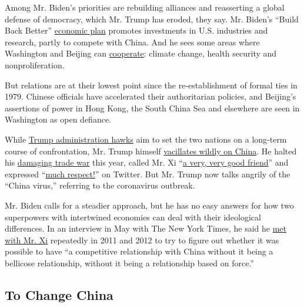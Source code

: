 Among Mr. Biden's priorities are rebuilding alliances and reasserting a
global defense of democracy, which Mr. Trump has eroded, they say. Mr.
Biden's ``Build Back Better''
\href{https://www.nytimes3xbfgragh.onion/2020/07/09/us/politics/biden-buy-american.html}{economic
plan} promotes investments in U.S. industries and research, partly to
compete with China. And he sees some areas where Washington and Beijing
can
\href{https://www.foreignaffairs.com/articles/united-states/2020-01-23/why-america-must-lead-again}{cooperate}:
climate change, health security and nonproliferation.

But relations are at their lowest point since the re-establishment of
formal ties in 1979. Chinese officials have accelerated their
authoritarian policies, and Beijing's assertions of power in Hong Kong,
the South China Sea and elsewhere are seen in Washington as open
defiance.

While
\href{https://www.nytimes3xbfgragh.onion/2020/07/25/world/asia/us-china-trump-xi.html}{Trump
administration hawks} aim to set the two nations on a long-term course
of confrontation, Mr. Trump himself
\href{https://www.nytimes3xbfgragh.onion/2020/06/18/us/politics/trump-china-bolton.html}{vacillates
wildly on China}. He halted his
\href{https://www.nytimes3xbfgragh.onion/2020/01/22/business/economy/trade-economy.html}{damaging
trade war} this year, called Mr. Xi
``\href{https://www.scmp.com/week-asia/opinion/article/3046586/donald-trump-really-xi-jinpings-friend-phase-one-us-china-trade}{a
very, very good friend}'' and expressed
``\href{https://twitter.com/realDonaldTrump/status/1243407157321560071?s=20}{much
respect!}'' on Twitter. But Mr. Trump now talks angrily of the ``China
virus,'' referring to the coronavirus outbreak.

Mr. Biden calls for a steadier approach, but he has no easy answers for
how two superpowers with intertwined economies can deal with their
ideological differences. In an interview in May with The New York Times,
he said he \href{http://en.people.cn/90883/7573905.html}{met with Mr.
Xi} repeatedly in 2011 and 2012 to try to figure out whether it was
possible to have ``a competitive relationship with China without it
being a bellicose relationship, without it being a relationship based on
force.''

\hypertarget{to-change-china}{%
\subsection{To Change China}\label{to-change-china}}

